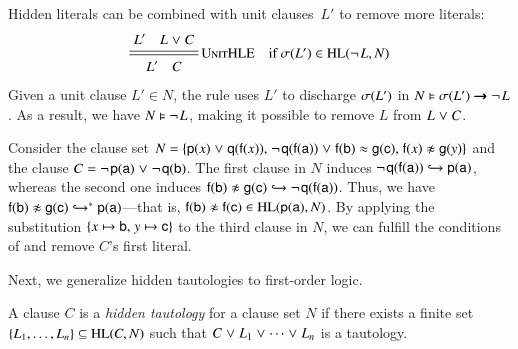 Hidden literals can be combined with unit clauses~$L'$ to remove more literals:
\[\namedsimpsc{UnitHLE}{L' \quad L \cor C}{L' \quad C}{\sigmaterm{L'} \in \HL(\neglit{L},N)}
\]
%
Given a unit clause $L' \in N$, the rule uses $L'$ to discharge $\sigmaterm{L'}$ in
$N \models \sigmaterm{L'} \impl \neglit{L}$. As a result, we have $N \models
\neglit{L}$, making it possible to remove $L$ from $L \cor C$.


\begin{exa}
   \label{example:unithle}
   Consider the clause set $N = \{\cst{p}(x) \cor \cst{q}(\cst{f}(x)){,}\;
   \neglit{\cst{q}(\cst{f}(\cst{a}))} \cor \eqlit{\cst{f}(\cst{b})}{\cst{g}(\cst{c})}{,}\;
   \neqlit{\cst{f}(x)}{\cst{g}(y)}\}$ and the clause $C = \neglit{\cst{p}(\cst{a})} \cor
   \neglit{\cst{q}(\cst{b})}$. The first clause in $N$ induces
   $\neglit{\cst{q}(\cst{f}(\cst{a}))} \bigfimpl{N} \cst{p}(\cst{a})$, whereas
   the second one induces $\neqlit{\cst{f}(\cst{b})}{\cst{g}(\cst{c})} \bigfimpl{N}
   \neglit{\cst{q}(\cst{f}(\cst{a}))}$. Thus, we have $\neqlit{\cst{f}(\cst{b})}{\cst{g}(\cst{c})}
   \bigfimpl{N}^\ast \cst{p}(\cst{a})$---that is, $\neqlit{\cst{f}(\cst{b})}{\cst{f}(\cst{c})} \in
   \HL(\cst{p}(\cst{a}), N)$. By applying the substitution $\{x \mapsto \cst{b}{,}\allowbreak\; y
   \mapsto \cst{c}\}$ to the third clause in $N$, we can fulfill the conditions of
    and remove $C$'s first literal.
\end{exa}

Next, we generalize hidden tautologies to first-order logic.

\begin{defi}
   A clause $C$ is a \emph{hidden tautology} for a clause set $N$ if there
   exists a finite set $\{L_1,\dots,L_n\} \subseteq \HL(C,N)$ such that
   $C \cor L_1 \cor \cdots \cor L_n$ is a tautology.
\end{defi}

